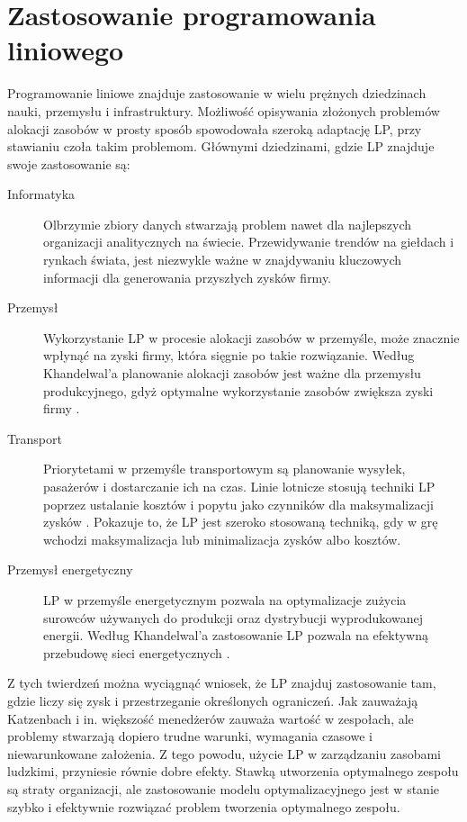 \section{Zastosowanie programowania liniowego}
\par Programowanie liniowe znajduje zastosowanie w wielu prężnych dziedzinach nauki, przemysłu i infrastruktury. Możliwość opisywania złożonych problemów alokacji zasobów w prosty sposób spowodowała szeroką adaptację LP, przy stawianiu czoła takim problemom. Głównymi dziedzinami, gdzie LP znajduje swoje zastosowanie są:
\begin{description}
    \item[Informatyka] Olbrzymie zbiory danych stwarzają problem nawet dla najlepszych organizacji analitycznych na świecie. Przewidywanie trendów na giełdach i rynkach świata, jest niezwykle ważne w znajdywaniu kluczowych informacji dla generowania przyszłych zysków firmy. \parencite{khandelwal2019building}
    \item[Przemysł] Wykorzystanie LP w procesie alokacji zasobów w przemyśle, może znacznie wpłynąć na zyski firmy, która sięgnie po takie rozwiązanie. Według Khandelwal'a planowanie alokacji zasobów jest ważne dla przemysłu produkcyjnego, gdyż optymalne wykorzystanie zasobów zwiększa zyski firmy \parencite{khandelwal2019building}.
    \item[Transport] Priorytetami w przemyśle transportowym są planowanie wysyłek, pasażerów i dostarczanie ich na czas. Linie lotnicze stosują techniki LP poprzez ustalanie kosztów i popytu jako czynników dla maksymalizacji zysków \parencite{khandelwal2019building}. Pokazuje to, że LP jest szeroko stosowaną techniką, gdy w grę wchodzi maksymalizacja lub minimalizacja zysków albo kosztów. 
    \item[Przemysł energetyczny] LP w przemyśle energetycznym pozwala na optymalizacje zużycia surowców używanych do produkcji oraz dystrybucji wyprodukowanej energii. Według Khandelwal'a zastosowanie LP pozwala na efektywną przebudowę sieci energetycznych \parencite{khandelwal2019building}.
\end{description}

\par Z tych twierdzeń można wyciągnąć wniosek, że LP znajduj zastosowanie tam, gdzie liczy się zysk i przestrzeganie określonych ograniczeń. Jak zauważają Katzenbach i in. \parencite{katzenbach2015wisdom} większość menedżerów zauważa wartość w zespołach, ale problemy stwarzają dopiero trudne warunki, wymagania czasowe i niewarunkowane założenia. Z tego powodu, użycie LP w zarządzaniu zasobami ludzkimi, przyniesie równie dobre efekty. Stawką utworzenia optymalnego zespołu są straty organizacji, ale zastosowanie modelu optymalizacyjnego jest w stanie szybko i efektywnie rozwiązać problem tworzenia optymalnego zespołu.